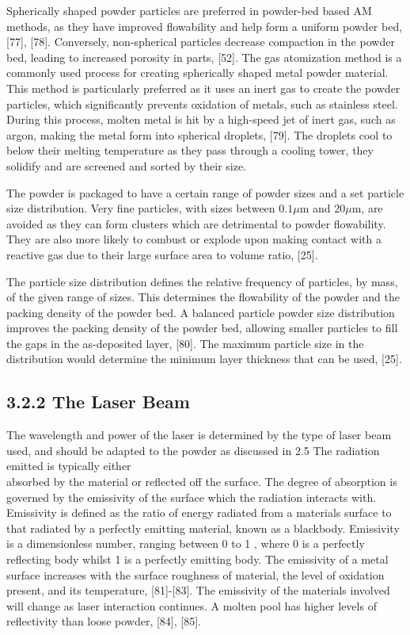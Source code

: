 \documentclass[10pt]{article}
\begin{document}
Spherically shaped powder particles are preferred in powder-bed based AM methods, as they have improved flowability and help form a uniform powder bed, [77], [78]. Conversely, non-spherical particles decrease compaction in the powder bed, leading to increased porosity in parts, [52]. The gas atomization method is a commonly used process for creating spherically shaped metal powder material. This method is particularly preferred as it uses an inert gas to create the powder particles, which significantly prevents oxidation of metals, such as stainless steel. During this process, molten metal is hit by a high-speed jet of inert gas, such as argon, making the metal form into spherical droplets, [79]. The droplets cool to below their melting temperature as they pass through a cooling tower, they solidify and are screened and sorted by their size.

The powder is packaged to have a certain range of powder sizes and a set particle size distribution. Very fine particles, with sizes between $0.1 \mu \mathrm{m}$ and $20 \mu \mathrm{m}$, are avoided as they can form clusters which are detrimental to powder flowability. They are also more likely to combust or explode upon making contact with a reactive gas due to their large surface area to volume ratio, [25].

The particle size distribution defines the relative frequency of particles, by mass, of the given range of sizes. This determines the flowability of the powder and the packing density of the powder bed. A balanced particle powder size distribution improves the packing density of the powder bed, allowing smaller particles to fill the gaps in the as-deposited layer, [80]. The maximum particle size in the distribution would determine the minimum layer thickness that can be used, [25].

\subsection*{3.2.2 The Laser Beam}
The wavelength and power of the laser is determined by the type of laser beam used, and should be adapted to the powder as discussed in 2.5 The radiation emitted is typically either\\
absorbed by the material or reflected off the surface. The degree of absorption is governed by the emissivity of the surface which the radiation interacts with. Emissivity is defined as the ratio of energy radiated from a materials surface to that radiated by a perfectly emitting material, known as a blackbody. Emissivity is a dimensionless number, ranging between 0 to 1 , where 0 is a perfectly reflecting body whilst 1 is a perfectly emitting body. The emissivity of a metal surface increases with the surface roughness of material, the level of oxidation present, and its temperature, [81]-[83]. The emissivity of the materials involved will change as laser interaction continues. A molten pool has higher levels of reflectivity than loose powder, [84], [85].
\end{document}
